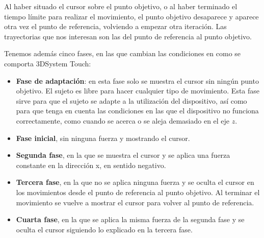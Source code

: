 \documentclass[a4paper,11pt, oneside]{book}
\begin{document}
 Al haber situado el cursor sobre el punto objetivo, o al haber terminado el tiempo límite para realizar el movimiento, el punto objetivo desaparece y aparece otra vez el punto de referencia, volviendo a empezar otra iteración. Las trayectorias que nos interesan son las del punto de referencia al punto objetivo.

Tenemos además cinco fases, en las que cambian las condiciones en como se comporta 3DSystem Touch:

\begin{itemize}
	\item \textbf{Fase de adaptación}: en esta fase solo se muestra el cursor sin ningún punto objetivo. El sujeto es libre para hacer cualquier tipo de movimiento. Esta fase sirve para que el sujeto se adapte a la utilización del dispositivo, así como para que tenga en cuenta las condiciones en las que el dispositivo no funciona correctamente, como cuando se acerca o se aleja demasiado en el eje $z$.
	\item \textbf{Fase inicial}, sin ninguna fuerza y mostrando el cursor.
	\item \textbf{Segunda fase}, en la que se muestra el cursor y se aplica una fuerza constante en la dirección x, en sentido negativo.
	\item \textbf{Tercera fase}, en la que no se aplica ninguna fuerza y se oculta el cursor en los movimientos desde el punto de referencia al punto objetivo. Al terminar el movimiento se vuelve a mostrar el cursor para volver al punto de referencia.
	\item \textbf{Cuarta fase}, en la que se aplica la misma fuerza de la segunda fase y se oculta el cursor siguiendo lo explicado en la tercera fase.
\end{itemize}
\end{document}
